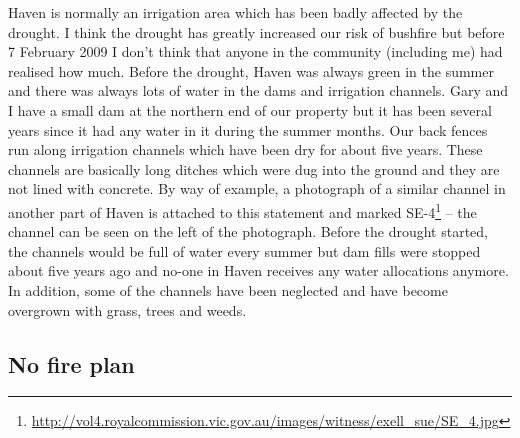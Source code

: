 \documentclass[a4paper]{article}
\begin{document}
    Haven is normally an irrigation area which has been badly affected by the drought. I think the drought has greatly increased our risk of bushfire but before 7 February 2009 I don't think that anyone in the community (including me) had realised how much. Before the drought, Haven was always green in the summer and there was always lots of water in the dams and irrigation channels. Gary and I have a small dam at the northern end of our property but it has been several years since it had any water in it during the summer months. Our back fences run along irrigation channels which have been dry for about five years. These channels are basically long ditches which were dug into the ground and they are not lined with concrete. By way of example, a photograph of a similar channel in another part of Haven is attached to this statement and marked SE-4\footnote{\url{http://vol4.royalcommission.vic.gov.au/images/witness/exell_sue/SE_4.jpg}} – the channel can be seen on the left of the photograph. Before the drought started, the channels would be full of water every summer but dam fills were stopped about five years ago and no-one in Haven receives any water allocations anymore. In addition, some of the channels have been neglected and have become overgrown with grass, trees and weeds.

\subsection{No fire plan}
\end{document}
